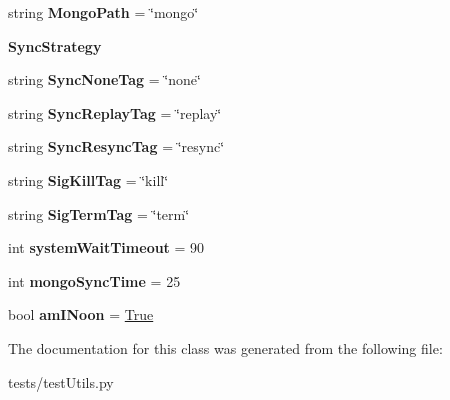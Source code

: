 \begin{DoxyCompactItemize}
string {\bfseries Mongo\+Path} = \char`\"{}mongo\char`\"{}
\item 
\mbox{\label{classtest_utils_1_1_utils_af45a92dedcfd4573387fd87d10af4336}} 
{\bfseries Sync\+Strategy}
\item 
\mbox{\label{classtest_utils_1_1_utils_a88b147afa8d97e38daf0a11479978d98}} 
string {\bfseries Sync\+None\+Tag} = \char`\"{}none\char`\"{}
\item 
\mbox{\label{classtest_utils_1_1_utils_abd6fdd4428dd697c9484cd240fa01378}} 
string {\bfseries Sync\+Replay\+Tag} = \char`\"{}replay\char`\"{}
\item 
\mbox{\label{classtest_utils_1_1_utils_a2de32df7d4338a8ce7be77513f0d3046}} 
string {\bfseries Sync\+Resync\+Tag} = \char`\"{}resync\char`\"{}
\item 
\mbox{\label{classtest_utils_1_1_utils_ac5b14df9bb31b6927f86254a04e030d8}} 
string {\bfseries Sig\+Kill\+Tag} = \char`\"{}kill\char`\"{}
\item 
\mbox{\label{classtest_utils_1_1_utils_ad7491e0ffcab72bdc2d9dedf8521c2c9}} 
string {\bfseries Sig\+Term\+Tag} = \char`\"{}term\char`\"{}
\item 
\mbox{\label{classtest_utils_1_1_utils_a34070b35a73aa90473f9efb27db98408}} 
int {\bfseries system\+Wait\+Timeout} = 90
\item 
\mbox{\label{classtest_utils_1_1_utils_a85fdd96cb00a44c21488e9c971187975}} 
int {\bfseries mongo\+Sync\+Time} = 25
\item 
\mbox{\label{classtest_utils_1_1_utils_ae1ee40d89538aa6f888245190226f868}} 
bool {\bfseries am\+I\+Noon} = \mbox{\hyperlink{struct_true}{True}}
\end{DoxyCompactItemize}


The documentation for this class was generated from the following file\+:\begin{DoxyCompactItemize}
\item 
tests/test\+Utils.\+py\end{DoxyCompactItemize}
